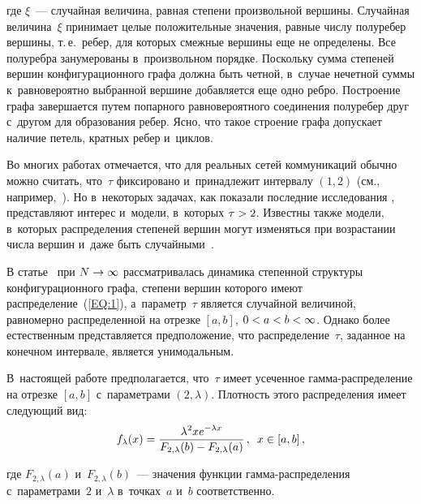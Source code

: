 \begin{multicols}{2}
\vspace*{-6pt}

\noindent где $\xi$~--- случайная величина, равная степени произвольной вершины.
Случайная величина~$\xi$ принимает целые положительные значения, равные чис\-лу полуребер
вершины, т.\,е.\ ребер, для которых смежные вершины еще не определены. Все полуребра
занумерованы в~произвольном порядке. Поскольку сумма степеней вершин конфигурационного
графа должна быть четной, в~случае нечетной суммы к~равновероятно выбранной вершине
добавляется еще одно ребро. Построение графа завершается путем попарного равновероятного
соединения полуребер друг с~другом для образования ребер. Ясно, что такое
строение графа допускает наличие петель, кратных ребер и~циклов.

Во многих работах отмечается, что для реальных сетей коммуникаций обыч\-но можно
считать, что~$\tau$ фиксировано и~принадлежит интервалу $(1,2)$ (см., 
например,~\cite{Dur,Hof,Fa,RN1}). Но в~некоторых задачах, как показали последние
исследования \cite{Ler1,Ler3}, пред\-став\-ля\-ют интерес и~модели, в~которых $\tau \hm>2$.
Известны также модели, в~которых распределения степеней вершин могут
изменяться при воз\-рас\-та\-нии чис\-ла вершин и~даже быть случайными~\cite{Bia}.

В статье~\cite{Pav} при $N\hm\rightarrow\infty$ рас\-смат\-ри\-ва\-лась динамика степенной
структуры конфигурационного графа, степени вершин которого имеют 
распределение~(\ref{EQ:1}), а~параметр~$\tau$ является случайной величиной, равномерно
распределенной на отрезке $[a,b]$, $0\hm<a\hm<b\hm<\infty$. Однако более естественным
пред\-став\-ля\-ет\-ся предположение, что распределение~$\tau$, заданное на конечном интервале,
является унимодальным. 

В~на\-сто\-ящей работе предполагается, что~$\tau$ имеет
усеченное гам\-ма-рас\-пре\-де\-ле\-ние на отрезке $[a,b]$ с~параметрами $(2,\lambda)$.
Плот\-ность этого распределения имеет сле\-ду\-ющий вид:
\begin{equation}\label{EQ:2}
f_{\lambda}(x)=\displaystyle\frac{\displaystyle \lambda^2xe^{-\lambda x}\mathstrut}{\displaystyle F_{2,\lambda}(b)-
F_{2,\lambda}(a)\mathstrut}\,, \enskip x\in[a,b]\,,
\end{equation}

\noindent где $F_{2,\lambda}(a)$ и~$F_{2,\lambda}(b)$~--- значения функции
гам\-ма-рас\-пре\-де\-ле\-ния с~па\-ра\-мет\-ра\-ми~$2$ и~$\lambda$ в~точ\-ках~$a$ и~$b$
соответственно.


\end{multicols}
